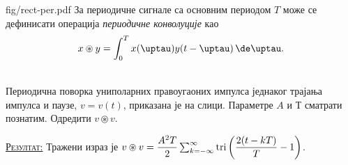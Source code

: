 \begin{slikaDesno}{fig/rect-per.pdf}
\PID За 
периодичне сигнале са основним 
периодом $T$ може се дефинисати 
операција \textit{периодичне
конволуције} као 
$$x \circledast y = \int_{0}^T 
x(\uptau) y(t-\uptau) \, \de \uptau.$$
\end{slikaDesno} \\
Периодична поворка 
униполарних
правоугаоних импулса једнаког трајања импулса и паузе,
$v = v(t)$, приказана је на слици. Параметре $A$ и $Т$ сматрати познатим.
Одредити $v \circledast v$.
\vspace*{2mm}

\textsc{\underline{Резултат:}}
Тражени израз је $v \circledast v = 
\dfrac{A^2 T}{2}
\sum_{k = -\infty}^{\infty}  
{\rm tri}\left( 
\dfrac{2(t - kT)}{T} - 1
\right)
$.